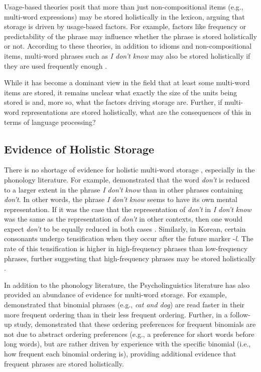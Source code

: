 \documentclass[
  authoryear,
  preprint,
  1p,
  onecolumn]{elsarticle}
\begin{document}
Usage-based theories posit that more than just non-compositional items
(e.g., multi-word expressions) may be stored holistically in the
lexicon, arguing that storage is driven by usage-based factors. For
example, factors like frequency or predictability of the phrase may
influence whether the phrase is stored holistically or not. According to
these theories, in addition to idioms and non-compositional items,
multi-word phrases such as \emph{I don't know} may also be stored
holistically if they are used frequently enough
\citep[e.g.,][]{ambridgeStoredAbstractionsRadical2020, kapatsinski2018, kapatsinski2009, hay2001, lee2015, arnon2010, stembergerFrequencyLexicalStorage1986, stemberger2004, morgan2016, tomasello2005}.

While it has become a dominant view in the field that at least some
multi-word items are stored, it remains unclear what exactly the size of
the units being stored is and, more so, what the factors driving storage
are. Further, if multi-word representations are stored holistically,
what are the consequences of this in terms of language processing?

\subsection{Evidence of Holistic
Storage}\label{evidence-of-holistic-storage}

There is no shortage of evidence for holistic multi-word storage
\citep[e.g.,][]{bybee1999, stembergerFrequencyLexicalStorage1986, stemberger2004, hay2001, christiansen2017, zwitserlood2018},
especially in the phonology literature. For example, \citet{bybee1999}
demonstrated that the word \emph{don't} is reduced to a larger extent in
the phrase \emph{I don't know} than in other phrases containing
\emph{don't}. In other words, the phrase \emph{I don't know} seems to
have its own mental representation. If it was the case that the
representation of \emph{don't} in \emph{I don't know} was the same as
the representation of \emph{don't} in other contexts, then one would
expect \emph{don't} to be equally reduced in both cases \citep[which is
contrary to the finding in][]{bybee1999}. Similarly, in Korean, certain
consonants undergo tensification when they occur after the future marker
-\emph{l}. The rate of this tensification is higher in high-frequency
phrases than low-frequency phrases, further suggesting that
high-frequency phrases may be stored holistically \citep{yi2002}.

In addition to the phonology literature, the Psycholinguistics
literature has also provided an abundance of evidence for multi-word
storage. For example, \citet{siyanova-chanturia2011} demonstrated that
binomial phrases (e.g., \emph{cat and dog}) are read faster in their
more frequent ordering than in their less frequent ordering. Further, in
a follow-up study, \citet{morgan2016} demonstrated that these ordering
preferences for frequent binomials are not due to abstract ordering
preferences (e.g., a preference for short words before long words), but
are rather driven by experience with the specific binomial (i.e., how
frequent each binomial ordering is), providing additional evidence that
frequent phrases are stored holistically.
\end{document}
